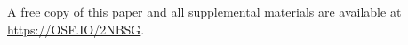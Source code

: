 \lipsum[1] %
%
A free copy of this paper and all supplemental materials are available at \url{https://OSF.IO/2NBSG}.

